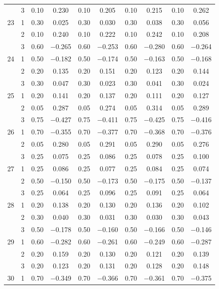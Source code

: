 \begin{longtable}{llcccccccc}
   & 3 & 0.10 & 0.230 & 0.10 & 0.205 & 0.10 & 0.215 & 0.10 & 0.262 \\ 
  23 & 1 & 0.30 & 0.025 & 0.30 & 0.030 & 0.30 & 0.038 & 0.30 & 0.056 \\ 
   & 2 & 0.10 & 0.240 & 0.10 & 0.222 & 0.10 & 0.242 & 0.10 & 0.208 \\ 
   & 3 & 0.60 & $-$0.265 & 0.60 & $-$0.253 & 0.60 & $-$0.280 & 0.60 & $-$0.264 \\ 
  24 & 1 & 0.50 & $-$0.182 & 0.50 & $-$0.174 & 0.50 & $-$0.163 & 0.50 & $-$0.168 \\ 
   & 2 & 0.20 & 0.135 & 0.20 & 0.151 & 0.20 & 0.123 & 0.20 & 0.144 \\ 
   & 3 & 0.30 & 0.047 & 0.30 & 0.023 & 0.30 & 0.041 & 0.30 & 0.024 \\ 
  25 & 1 & 0.20 & 0.141 & 0.20 & 0.137 & 0.20 & 0.111 & 0.20 & 0.127 \\ 
   & 2 & 0.05 & 0.287 & 0.05 & 0.274 & 0.05 & 0.314 & 0.05 & 0.289 \\ 
   & 3 & 0.75 & $-$0.427 & 0.75 & $-$0.411 & 0.75 & $-$0.425 & 0.75 & $-$0.416 \\ 
  26 & 1 & 0.70 & $-$0.355 & 0.70 & $-$0.377 & 0.70 & $-$0.368 & 0.70 & $-$0.376 \\ 
   & 2 & 0.05 & 0.280 & 0.05 & 0.291 & 0.05 & 0.290 & 0.05 & 0.276 \\ 
   & 3 & 0.25 & 0.075 & 0.25 & 0.086 & 0.25 & 0.078 & 0.25 & 0.100 \\ 
  27 & 1 & 0.25 & 0.086 & 0.25 & 0.077 & 0.25 & 0.084 & 0.25 & 0.074 \\ 
   & 2 & 0.50 & $-$0.150 & 0.50 & $-$0.173 & 0.50 & $-$0.175 & 0.50 & $-$0.137 \\ 
   & 3 & 0.25 & 0.064 & 0.25 & 0.096 & 0.25 & 0.091 & 0.25 & 0.064 \\ 
  28 & 1 & 0.20 & 0.138 & 0.20 & 0.130 & 0.20 & 0.136 & 0.20 & 0.102 \\ 
   & 2 & 0.30 & 0.040 & 0.30 & 0.031 & 0.30 & 0.030 & 0.30 & 0.043 \\ 
   & 3 & 0.50 & $-$0.178 & 0.50 & $-$0.160 & 0.50 & $-$0.166 & 0.50 & $-$0.146 \\ 
  29 & 1 & 0.60 & $-$0.282 & 0.60 & $-$0.261 & 0.60 & $-$0.249 & 0.60 & $-$0.287 \\ 
   & 2 & 0.20 & 0.159 & 0.20 & 0.130 & 0.20 & 0.121 & 0.20 & 0.139 \\ 
   & 3 & 0.20 & 0.123 & 0.20 & 0.131 & 0.20 & 0.128 & 0.20 & 0.148 \\ 
  30 & 1 & 0.70 & $-$0.349 & 0.70 & $-$0.366 & 0.70 & $-$0.361 & 0.70 & $-$0.375 \\ 

\end{longtable}
